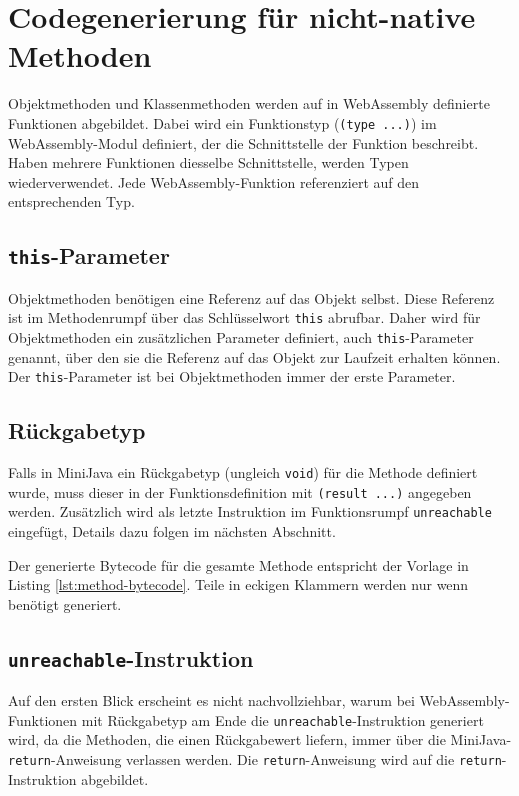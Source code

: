 \section{Codegenerierung für nicht-native Methoden}

Objektmethoden und Klassenmethoden werden auf in WebAssembly definierte Funktionen abgebildet. Dabei wird ein Funktionstyp (\lstinline{(type ...)}) im WebAssembly-Modul definiert, der die Schnittstelle der Funktion beschreibt. Haben mehrere Funktionen diesselbe Schnittstelle, werden Typen wiederverwendet. Jede WebAssembly-Funktion referenziert auf den entsprechenden Typ.

\subsection{\lstinline{this}-Parameter}
\label{subsec:this-Parameter}
Objektmethoden benötigen eine Referenz auf das Objekt selbst. Diese Referenz ist im Methodenrumpf über das Schlüsselwort \lstinline{this} abrufbar. Daher wird für Objektmethoden ein zusätzlichen Parameter definiert, auch \lstinline{this}-Parameter genannt, über den sie die Referenz auf das Objekt zur Laufzeit erhalten können. Der \lstinline{this}-Parameter ist bei Objektmethoden immer der erste Parameter.

\subsection{Rückgabetyp}
Falls in MiniJava ein Rückgabetyp (ungleich \lstinline{void}) für die Methode definiert wurde, muss dieser in der Funktionsdefinition mit \lstinline{(result ...)} angegeben werden. Zusätzlich wird als letzte Instruktion im Funktionsrumpf \lstinline{unreachable} eingefügt, Details dazu folgen im nächsten Abschnitt.

Der generierte Bytecode für die gesamte Methode entspricht der Vorlage in Listing \ref{lst:method-bytecode}. Teile in eckigen Klammern werden nur wenn benötigt generiert.



\subsection{\lstinline{unreachable}-Instruktion}
Auf den ersten Blick erscheint es nicht nachvollziehbar, warum bei Web\-As\-sem\-bly-Funk\-tio\-nen mit Rückgabetyp am Ende die \lstinline{unreachable}-Instruktion generiert wird, da die Methoden, die einen Rückgabewert liefern, immer über die MiniJava-\lstinline{return}-Anweisung verlassen werden. Die \lstinline{return}-Anweisung wird auf die \lstinline{return}-Instruktion abgebildet.

